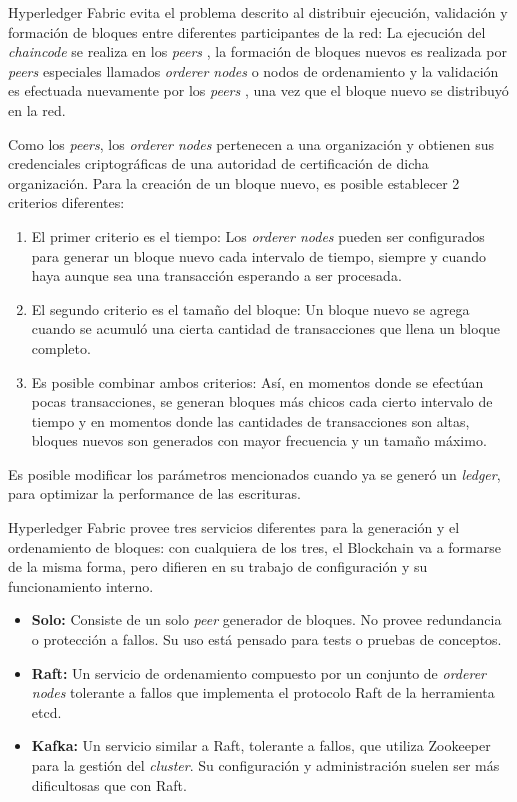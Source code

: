 Hyperledger Fabric evita el problema descrito al distribuir ejecución, validación y formación de bloques entre diferentes participantes de la red: La ejecución del \textit{chaincode} se realiza en los \textit{peers} , la formación de bloques nuevos es realizada por \textit{peers}  especiales llamados \textit{orderer nodes} o nodos de ordenamiento y la validación es efectuada nuevamente por los \textit{peers} , una vez que el bloque nuevo se distribuyó en la red. 

Como los \textit{peers}, los \textit
{orderer nodes} pertenecen a una organización y obtienen sus credenciales criptográficas de una autoridad de certificación de dicha organización. Para la creación de un bloque nuevo, es posible establecer 2 criterios diferentes: 

\begin{enumerate}
    \item El primer criterio es el tiempo: Los \textit{orderer nodes} pueden ser configurados para generar un bloque nuevo cada intervalo de tiempo, siempre y cuando haya aunque sea una transacción esperando a ser procesada.
    \item El segundo criterio es el tamaño del bloque: Un bloque nuevo se agrega cuando se acumuló una cierta cantidad de transacciones que llena un bloque completo.
    \item Es posible combinar ambos criterios: Así, en momentos donde se efectúan pocas transacciones, se generan bloques más chicos cada cierto intervalo de tiempo y en momentos donde las cantidades de transacciones son altas, bloques nuevos son generados con mayor frecuencia y un tamaño máximo.
\end{enumerate}

Es posible modificar los parámetros mencionados cuando ya se generó un \textit{ledger}, para optimizar la performance de las escrituras.

Hyperledger Fabric provee tres servicios diferentes para la generación y el ordenamiento de bloques: con cualquiera de los tres, el Blockchain va a formarse de la misma forma, pero difieren en su trabajo de configuración y su funcionamiento interno.

\begin{itemize}
    \item \textbf{Solo: }Consiste de un solo \textit{peer} generador de bloques. No provee redundancia o protección a fallos. Su uso está pensado para tests o pruebas de conceptos.
    \item \textbf{Raft: }Un servicio de ordenamiento compuesto por un conjunto de \textit{orderer nodes} tolerante a fallos que implementa el protocolo Raft de la herramienta etcd.\cite{raft_algorithm}
    \item \textbf{Kafka: }Un servicio similar a Raft, tolerante a fallos, que utiliza Zookeeper para la gestión del \textit{cluster}. Su configuración y administración suelen ser más dificultosas que con Raft.
\end{itemize}


